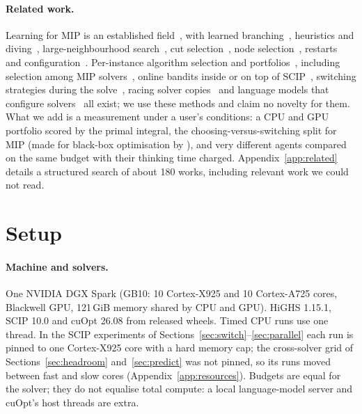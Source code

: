\documentclass[11pt]{article}
\begin{document}
\paragraph{Related work.} Learning for MIP is an established field~\citep{bengio2021ml,scavuzzo2024ml}, with learned
branching~\citep{khalil2016learning,gasse2019exact}, heuristics and diving~\citep{khalil2017heuristics,nair2020solving,
chmiela2021learning}, large-neighbourhood search~\citep{song2020general,sonnerat2021learning,huang2023searching}, cut
selection~\citep{tang2020rl,paulus2022learning,wang2023learning}, node selection~\citep{he2014learning,labassi2022nodes},
restarts~\citep{anderson2019restarts} and configuration~\citep{hutter2010mipconfig,valentin2022instance,li2025benloc}.
Per-instance algorithm selection and portfolios~\citep{rice1976algorithm,xu2008satzilla,xu2011hydramip,bischl2016aslib},
including selection among MIP solvers~\citep{lindauer2019oasc,szeider2026zerofolio}, online bandits inside or on top
of SCIP~\citep{hendel2019bandits,chmiela2023online,cai2025balans}, switching strategies during the
solve~\citep{diliberto2016dash,hendel2017phases,berthold2018phases}, racing solver copies~\citep{mexi2026rexi,
yilmaz2025parbalans} and language models that configure solvers~\citep{lawless2025llm,luo2026grimip,cai2025multitask,
pellegrino2025transformer} all exist; we use these methods and claim no novelty for them. What we add is a measurement
under a user's conditions: a CPU and GPU portfolio scored by the primal integral, the choosing-versus-switching split
for MIP (made for black-box optimisation by \citet{vermetten2020dynamic}), and very different agents compared on the
same budget with their thinking time charged. Appendix~\ref{app:related} details a structured search of about 180
works, including relevant work we could not read.

\section{Setup}\label{sec:setup}
\paragraph{Machine and solvers.} One NVIDIA DGX Spark (GB10: 10 Cortex-X925 and 10 Cortex-A725 cores, Blackwell GPU,
121\,GiB memory shared by CPU and GPU). HiGHS 1.15.1, SCIP 10.0 and cuOpt 26.08 from released wheels. Timed CPU runs
use one thread. In the SCIP experiments of Sections~\ref{sec:switch}--\ref{sec:parallel} each run is pinned to one
Cortex-X925 core with a hard memory cap; the cross-solver grid of Sections~\ref{sec:headroom} and~\ref{sec:predict} was
not pinned, so its runs moved between fast and slow cores (Appendix~\ref{app:resources}). Budgets are equal for the
solver; they do not equalise total compute: a local language-model server and cuOpt's host threads are extra.
\end{document}
